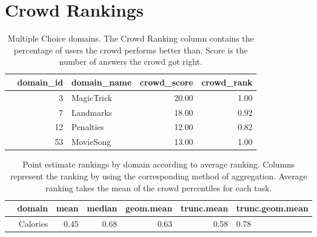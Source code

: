 \documentclass[12pt]{article}
\begin{document}
\clearpage

\section{Crowd Rankings}

\begin{table}[ht!]
\centering
\begin{tabular}{rrlrr}
  \hline
 & domain\_id & domain\_name & crowd\_score & crowd\_rank \\ 
  \hline
   & 3 & MagicTrick & 20.00 & 1.00 \\ 
   & 7 & Landmarks & 18.00 & 0.92 \\ 
   & 12 & Penalties & 12.00 & 0.82 \\ 
   & 53 & MovieSong & 13.00 & 1.00 \\ 
   \hline
\end{tabular}
\caption{Multiple Choice domains. The Crowd Ranking column contains the percentage of users the crowd performs better than. Score is the number of answers the crowd got right.} 
\end{table}


\begin{table}[ht!]
\centering
\begin{tabular}{rrrrrrl}
  \hline
  & domain & mean & median & geom.mean & trunc.mean & trunc.geom.mean \\ 
  \hline
 &  Calories & 0.45 & 0.68 & 0.63 & 0.58 &  0.78\\ 
   \hline
\end{tabular}
\caption{Point estimate rankings by domain according to average ranking. Columns represent the ranking by using the corresponding method of aggregation. Average ranking takes the mean of the crowd percentiles for each task.} 
\end{table}
\end{document}
